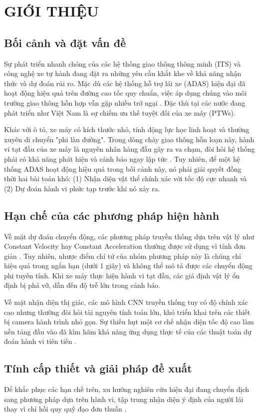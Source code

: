 \section{GIỚI THIỆU}
	\subsection{Bối cảnh và đặt vấn đề}
	Sự phát triển nhanh chóng của các hệ thống giao thông thông minh (ITS) và công nghệ xe tự hành đang đặt ra những yêu cầu khắt khe về khả năng nhận thức và dự đoán rủi ro. Mặc dù các hệ thống hỗ trợ lái xe (ADAS) hiện đại đã hoạt động hiệu quả trên đường cao tốc quy chuẩn, việc áp dụng chúng vào môi trường giao thông hỗn hợp vẫn gặp nhiều trở ngại \cite{Lefvre2014ASO}. Đặc thù tại các nước đang phát triển như Việt Nam là sự chiếm ưu thế tuyệt đối của xe máy (PTWs).
	
	Khác với ô tô, xe máy có kích thước nhỏ, tính động lực học linh hoạt và thường xuyên di chuyển "phi làn đường". Trong dòng chảy giao thông hỗn loạn này, hành vi tạt đầu của xe máy là nguyên nhân hàng đầu gây ra va chạm, đòi hỏi hệ thống phải có khả năng phát hiện và cảnh báo ngay lập tức \cite{Zeng2025TrajectoryPF}. Tuy nhiên, để một hệ thống ADAS hoạt động hiệu quả trong bối cảnh này, nó phải giải quyết đồng thời hai bài toán khó: (1) Nhận diện vật thể chính xác với tốc độ cực nhanh và (2) Dự đoán hành vi phức tạp trước khi nó xảy ra.
	
	\subsection{Hạn chế của các phương pháp hiện hành}
	Về mặt dự đoán chuyển động, các phương pháp truyền thống dựa trên vật lý như Constant Velocity hay Constant Acceleration thường được sử dụng vì tính đơn giản \cite{Lefvre2014ASO}. Tuy nhiên, nhược điểm chí tử của nhóm phương pháp này là chúng chỉ hiệu quả trong ngắn hạn (dưới 1 giây) và không thể mô tả được các chuyển động phi tuyến tính. Khi xe máy thực hiện hành vi tạt đầu, các giả định vật lý ổn định bị phá vỡ, dẫn đến độ trễ lớn trong cảnh báo.
	
	Về mặt nhận diện thị giác, các mô hình CNN truyền thống tuy có độ chính xác cao nhưng thường đòi hỏi tài nguyên tính toán lớn, khó triển khai trên các thiết bị camera hành trình nhỏ gọn. Sự thiếu hụt một cơ chế nhận diện tốc độ cao làm nền tảng đầu vào đã kìm hãm khả năng ứng dụng thực tế của các thuật toán dự đoán hành vi tiên tiến \cite{Mozaffari2020DeepLV}.
	
	\subsection{Tính cấp thiết và giải pháp đề xuất}
	Để khắc phục các hạn chế trên, xu hướng nghiên cứu hiện đại đang chuyển dịch sang phương pháp dựa trên hành vi, tập trung nhận diện ý định của người lái thay vì chỉ hồi quy quỹ đạo đơn thuần \cite{Zeng2025TrajectoryPF}.
	
